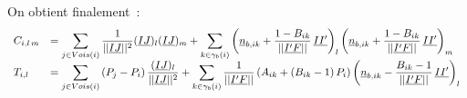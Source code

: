 On obtient finalement~: 
\begin{equation}
\begin{array}{ll}
C_{i,l\,m} &= \displaystyle
\sum\limits_{j\in Vois(i)}\frac{1}{||\underline{IJ}||^2}(\underline{IJ})_l(\underline{IJ})_m 
+\sum\limits_{k\in \gamma_b(i)}\left(\underline{n}_{b,ik}+\frac{1-B_{ik}}{||\underline{I'F}||}\,\underline{II'}\right)_{l}
                               \left(\underline{n}_{b,ik}+\frac{1-B_{ik}}{||\underline{I'F}||}\,\underline{II'}\right)_{m}\\
T_{i,l} &=\displaystyle
\sum\limits_{j\in Vois(i)}\left(P_j-P_i\right)\frac{(\underline{IJ})_l}{||\underline{IJ}||^2}
+\sum\limits_{k\in\gamma_b(i)}\frac{1}{||\underline{I'F}||}\left(A_{ik}+(B_{ik}-1)\,P_i\right)
                             \left(\underline{n}_{b,ik}-\frac{B_{ik}-1}{||\underline{I'F}||}\,\underline{II'}\right)_{l}
\end{array}
\end{equation}

